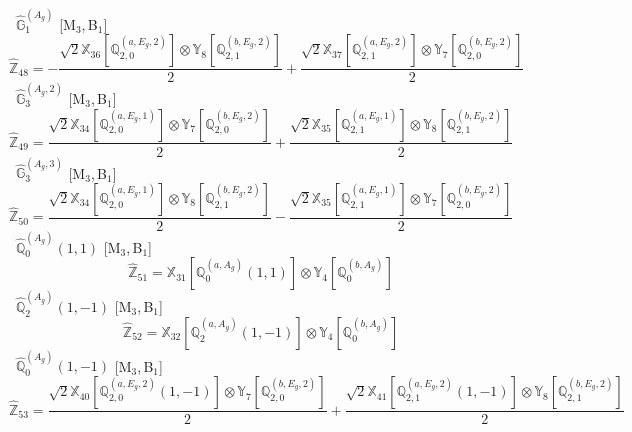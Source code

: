 \documentclass[fleqn,10pt,landscape]{article}
\begin{document}
\begin{itemize}
\begin{dmath*}
\end{dmath*}
\vspace{4mm}
\noindent {} $\,\,\,\hat{\mathbb{G}}_{1}^{(A_{g})}$ [M$_{3}$,\,B$_{1}$]
\begin{dmath*}
\hat{\mathbb{Z}}_{48}=- \frac{\sqrt{2} \mathbb{X}_{36}[\mathbb{Q}_{2,0}^{(a,E_{g},2)}] \otimes\mathbb{Y}_{8}[\mathbb{Q}_{2,1}^{(b,E_{g},2)}]}{2} + \frac{\sqrt{2} \mathbb{X}_{37}[\mathbb{Q}_{2,1}^{(a,E_{g},2)}] \otimes\mathbb{Y}_{7}[\mathbb{Q}_{2,0}^{(b,E_{g},2)}]}{2}
\end{dmath*}
\vspace{4mm}
\noindent {} $\,\,\,\hat{\mathbb{G}}_{3}^{(A_{g},2)}$ [M$_{3}$,\,B$_{1}$]
\begin{dmath*}
\hat{\mathbb{Z}}_{49}=\frac{\sqrt{2} \mathbb{X}_{34}[\mathbb{Q}_{2,0}^{(a,E_{g},1)}] \otimes\mathbb{Y}_{7}[\mathbb{Q}_{2,0}^{(b,E_{g},2)}]}{2} + \frac{\sqrt{2} \mathbb{X}_{35}[\mathbb{Q}_{2,1}^{(a,E_{g},1)}] \otimes\mathbb{Y}_{8}[\mathbb{Q}_{2,1}^{(b,E_{g},2)}]}{2}
\end{dmath*}
\vspace{4mm}
\noindent {} $\,\,\,\hat{\mathbb{G}}_{3}^{(A_{g},3)}$ [M$_{3}$,\,B$_{1}$]
\begin{dmath*}
\hat{\mathbb{Z}}_{50}=\frac{\sqrt{2} \mathbb{X}_{34}[\mathbb{Q}_{2,0}^{(a,E_{g},1)}] \otimes\mathbb{Y}_{8}[\mathbb{Q}_{2,1}^{(b,E_{g},2)}]}{2} - \frac{\sqrt{2} \mathbb{X}_{35}[\mathbb{Q}_{2,1}^{(a,E_{g},1)}] \otimes\mathbb{Y}_{7}[\mathbb{Q}_{2,0}^{(b,E_{g},2)}]}{2}
\end{dmath*}
\vspace{4mm}
\noindent {} $\,\,\,\hat{\mathbb{Q}}_{0}^{(A_{g})}(1,1)$ [M$_{3}$,\,B$_{1}$]
\begin{dmath*}
\hat{\mathbb{Z}}_{51}=\mathbb{X}_{31}[\mathbb{Q}_{0}^{(a,A_{g})}(1,1)] \otimes\mathbb{Y}_{4}[\mathbb{Q}_{0}^{(b,A_{g})}]
\end{dmath*}
\vspace{4mm}
\noindent {} $\,\,\,\hat{\mathbb{Q}}_{2}^{(A_{g})}(1,-1)$ [M$_{3}$,\,B$_{1}$]
\begin{dmath*}
\hat{\mathbb{Z}}_{52}=\mathbb{X}_{32}[\mathbb{Q}_{2}^{(a,A_{g})}(1,-1)] \otimes\mathbb{Y}_{4}[\mathbb{Q}_{0}^{(b,A_{g})}]
\end{dmath*}
\vspace{4mm}
\noindent {} $\,\,\,\hat{\mathbb{Q}}_{0}^{(A_{g})}(1,-1)$ [M$_{3}$,\,B$_{1}$]
\begin{dmath*}
\hat{\mathbb{Z}}_{53}=\frac{\sqrt{2} \mathbb{X}_{40}[\mathbb{Q}_{2,0}^{(a,E_{g},2)}(1,-1)] \otimes\mathbb{Y}_{7}[\mathbb{Q}_{2,0}^{(b,E_{g},2)}]}{2} + \frac{\sqrt{2} \mathbb{X}_{41}[\mathbb{Q}_{2,1}^{(a,E_{g},2)}(1,-1)] \otimes\mathbb{Y}_{8}[\mathbb{Q}_{2,1}^{(b,E_{g},2)}]}{2}

\end{dmath*}
\end{itemize}
\end{document}
